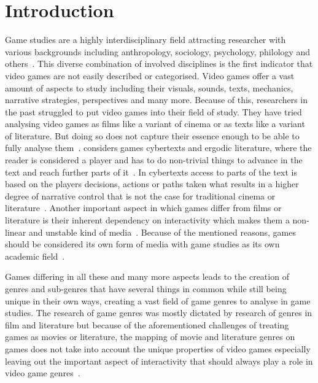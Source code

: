 \documentclass[11pt, a4paper]{article}
\begin{document}
\clearpage\section{Introduction}\label{sec:introduction}
Game studies are a highly interdisciplinary field attracting researcher with various backgrounds including anthropology,
sociology, psychology, philology and others~\parencite{Aarseth2001}.
This diverse combination of involved disciplines is the first indicator that video games are not easily described or
categorised.
Video games offer a vast amount of aspects to study including their visuals, sounds, texts, mechanics, narrative
strategies, perspectives and many more.
Because of this, researchers in the past struggled to put video games into their field of study.
They have tried analysing video games as films like a variant of cinema or as texts like a variant of literature.
But doing so does not capture their essence enough to be able to fully analyse them~\parencite{Aarseth2001}.
\cite{Aarseth1997} considers games cybertexts and ergodic literature, where the reader is considered a player and
has to do non-trivial things to advance in the text and reach further parts of it~\parencite[1, 4]{Aarseth1997}.
In cybertexts access to parts of the text is based on the players decisions, actions or paths taken what
results in a higher degree of narrative control that is not the case for traditional cinema or
literature~\parencite[3-4]{Aarseth1997}.
Another important aspect in which games differ from films or literature is their inherent dependency on interactivity
which makes them a non-linear and unstable kind of media~\parencite[6-7]{Apperley2006}.
Because of the mentioned reasons, games should be considered its own form of media with game studies as its own
academic field~\parencite{Aarseth2001}.

Games differing in all these and many more aspects leads to the creation of genres and sub-genres
that have several things in common while still being unique in their own ways, creating a vast
field of game genres to analyse in game studies.
The research of game genres was mostly dictated by research of genres in film and literature but
because of the aforementioned challenges of treating games as movies or literature, the mapping of
movie and literature genres on games does not take into account the unique properties of video
games especially leaving out the important aspect of interactivity that should always play a role
in video game genres~\parencite[7]{Apperley2006}.
\end{document}
